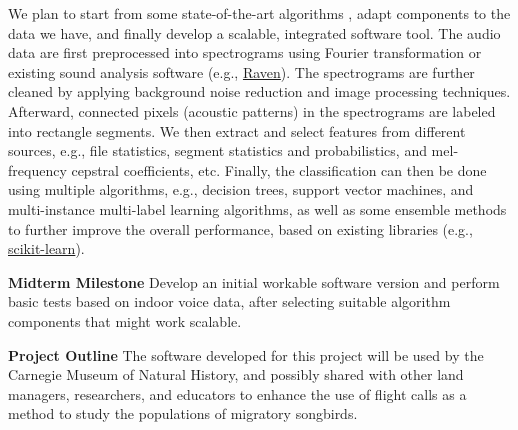 \documentclass{article} %
\begin{document}
We plan to start from some state-of-the-art algorithms \cite{briggs2013instance,Lasseck13,Massaron13,stattnersong13}, adapt components to the data we have, and finally develop a scalable, integrated software tool.
The audio data are first preprocessed into spectrograms using Fourier transformation or existing sound analysis software (e.g., \href{http://www.birds.cornell.edu/brp/raven/}{Raven}). The spectrograms are further cleaned by applying background noise reduction and image processing techniques. Afterward, connected pixels (acoustic patterns) in the spectrograms are labeled into rectangle segments.  We then extract and select features from different sources, e.g., file statistics, segment statistics and probabilistics, and mel-frequency cepstral coefficients, etc. Finally, the classification can then be done using multiple algorithms, e.g., decision trees, support vector machines, and multi-instance multi-label learning algorithms, as well as some ensemble methods to further improve the overall performance, based on existing libraries (e.g., \href{http://scikit-learn.org}{scikit-learn}). %


{\bf Midterm Milestone} Develop an initial workable software version and perform basic tests based on indoor voice data, after selecting suitable algorithm components that might work scalable.

{\bf Project Outline} The software developed for this project will be used by the Carnegie Museum of Natural History, and possibly shared with other land managers, researchers, and educators to enhance the use of flight calls as a method to study the populations of migratory songbirds. %
\end{document}
